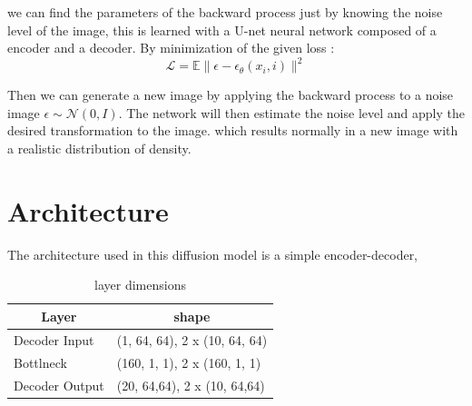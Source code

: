 \documentclass[11pt,a4paper]{report}
\begin{document}
\begin{multicols*}{2}
    we can find the parameters of the backward process just by knowing the noise level of the image, this is learned with a U-net neural network composed of a encoder and a decoder.
    By minimization of the given loss :
    \begin{equation}
        \mathcal{L} = \mathbb{E} \lVert \epsilon - \epsilon_\theta (x_i, i) \rVert ^2
        \label{eq:Loss}
    \end{equation}

    Then we can generate a new image by applying the backward process to a noise image $\epsilon \sim \mathcal{N} (0,I)$. The network will then estimate the noise level and apply the desired transformation to the image.
    which results normally in a new image with a realistic distribution of density.
    \section{Architecture}
    The architecture used in this diffusion model is a simple encoder-decoder,
    \begin{table}[H]
        \begin{small}
            \caption{layer dimensions}
            \label{tab:Size}
            \begin{center}
                \begin{tabular}[c]{l|l}
                    \hline
                    \multicolumn{1}{c|}{\textbf{Layer}} &
                    \multicolumn{1}{c}{\textbf{shape}}                                  \\
                    \hline
                    Decoder Input                       & (1, 64, 64), 2 x (10, 64, 64) \\
                    Bottlneck                           & (160, 1, 1), 2 x (160, 1, 1)  \\
                    Decoder Output                      & (20, 64,64), 2 x (10, 64,64)  \\


\end{tabular}
\end{center}
\end{small}
\end{table}
\end{multicols*}
\end{document}
